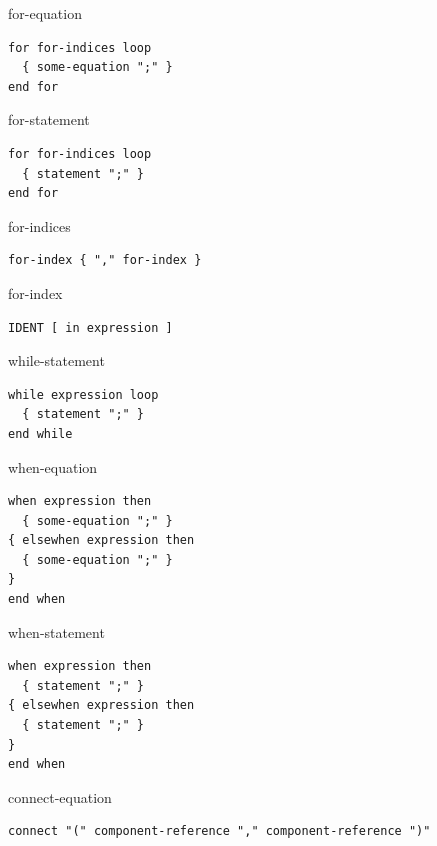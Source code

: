 \begin{production}{for-equation}
\begin{lstlisting}
for for-indices loop
  { some-equation ";" }
end for
\end{lstlisting}
\end{production}

\begin{production}{for-statement}
\begin{lstlisting}
for for-indices loop
  { statement ";" }
end for
\end{lstlisting}
\end{production}

\begin{production}{for-indices}
\begin{lstlisting}
for-index { "," for-index }
\end{lstlisting}
\end{production}

\begin{production}{for-index}
\begin{lstlisting}
IDENT [ in expression ]
\end{lstlisting}
\end{production}

\begin{production}{while-statement}
\begin{lstlisting}
while expression loop
  { statement ";" }
end while
\end{lstlisting}
\end{production}

\begin{production}{when-equation}
\begin{lstlisting}
when expression then
  { some-equation ";" }
{ elsewhen expression then
  { some-equation ";" }
}
end when
\end{lstlisting}
\end{production}

\begin{production}{when-statement}
\begin{lstlisting}
when expression then
  { statement ";" }
{ elsewhen expression then
  { statement ";" }
}
end when
\end{lstlisting}
\end{production}

\begin{production}{connect-equation}
\begin{lstlisting}
connect "(" component-reference "," component-reference ")"
\end{lstlisting}
\end{production}

